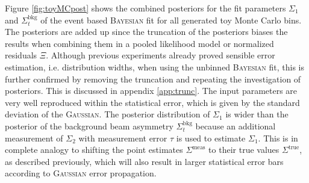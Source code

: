 Figure \ref{fig:toyMCpost} shows the combined posteriors for the fit parameters $\Sigma_1$ and $\Sigma_t^\text{bkg}$ of the event based \textsc{Bayesian} fit for all generated toy Monte Carlo bins. The posteriors are added up since the truncation of the posteriors biases the results when combining them in a pooled likelihood model or normalized residuals $\Xi$. Although previous experiments already proved sensible error estimation, i.e. distribution widths, when using the unbinned \textsc{Bayesian} fit, this is further confirmed by removing the truncation and repeating the investigation of posteriors. This is discussed in appendix \ref{app:trunc}. The input parameters are very well reproduced within the statistical error, which is given by the standard deviation of the \textsc{Gaussian}. The posterior distribution of $\Sigma_1$ is wider than the posterior of the background beam asymmetry $\Sigma_t^\text{bkg}$ because an additional measurement of $\Sigma_2$ with measurement error $\tau$ is used to estimate $\Sigma_1$. This is in complete analogy to shifting the point estimates $\Sigma^\text{meas}$ to their true values $\Sigma^\text{true}$, as described previously, which will also result in larger statistical error bars according to \textsc{Gaussian} error propagation.
